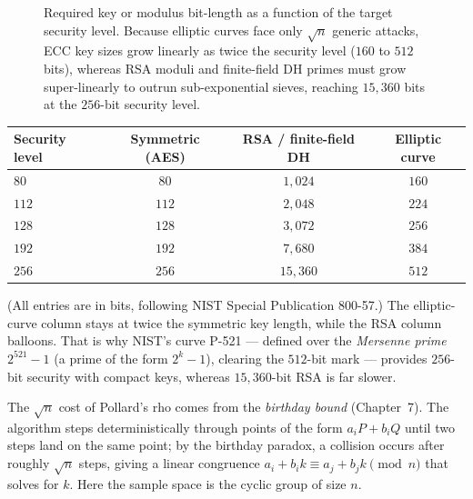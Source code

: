 \begin{figure}[htbp]
\caption{Required key or modulus bit-length as a function of the target security level.
Because elliptic curves face only $\sqrt{n}$ generic attacks, ECC key sizes grow linearly
as twice the security level ($160$ to $512$ bits), whereas RSA moduli and finite-field DH
primes must grow super-linearly to outrun sub-exponential sieves, reaching $15{,}360$ bits
at the $256$-bit security level.}
\label{fig:ch21-keysize-chart}
\end{figure}

\begin{center}
\begin{tabular}{lccc}
\toprule
Security level & Symmetric (AES) & RSA / finite-field DH & Elliptic curve \\
\midrule
$80$  & $80$  & $1{,}024$  & $160$ \\
$112$ & $112$ & $2{,}048$  & $224$ \\
$128$ & $128$ & $3{,}072$  & $256$ \\
$192$ & $192$ & $7{,}680$  & $384$ \\
$256$ & $256$ & $15{,}360$ & $512$ \\
\bottomrule
\end{tabular}
\end{center}

(All entries are in bits, following NIST Special Publication 800-57.) The elliptic-curve
column stays at twice the symmetric key length, while the RSA column balloons. That is why
NIST's curve P-521 --- defined over the \emph{Mersenne prime} $2^{521}-1$ (a prime of the
form $2^k - 1$), clearing the $512$-bit mark --- provides $256$-bit security with compact
keys, whereas $15{,}360$-bit RSA is far slower.

\begin{connectionbox}
The $\sqrt n$ cost of Pollard's rho comes from the \emph{birthday bound} (Chapter~7). The
algorithm steps deterministically through points of the form $a_i P + b_i Q$ until two
steps land on the same point; by the birthday paradox, a collision occurs after roughly
$\sqrt n$ steps, giving a linear congruence $a_i + b_i k \equiv a_j + b_j k \pmod n$ that
solves for $k$. Here the sample space is the cyclic group of size $n$.
\end{connectionbox}

